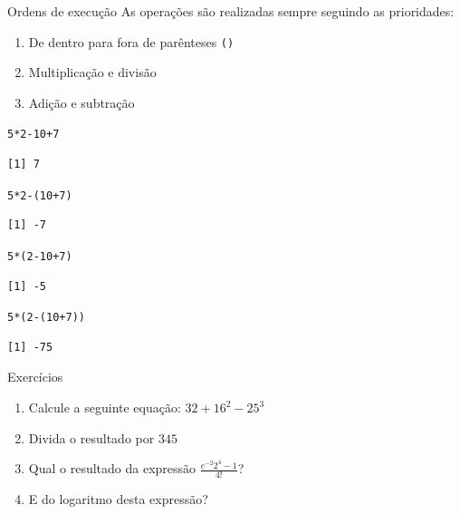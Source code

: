 \documentclass[10pt,handout]{beamer}\usepackage[]{graphicx}\usepackage[]{color}
\makeatletter
\newcommand{\hlnum}[1]{\textcolor[rgb]{0.686,0.059,0.569}{#1}}%
\newcommand{\hlopt}[1]{\textcolor[rgb]{0,0,0}{#1}}%
\newcommand{\hlstd}[1]{\textcolor[rgb]{0.345,0.345,0.345}{#1}}%
\newenvironment{kframe}{%
 \def\at@end@of@kframe{}%
 \ifinner\ifhmode%
  \def\at@end@of@kframe{\end{minipage}}%
  \begin{minipage}{\columnwidth}%
 \fi\fi%
 \def\FrameCommand##1{\hskip\@totalleftmargin \hskip-\fboxsep
 \colorbox{shadecolor}{##1}\hskip-\fboxsep
     \hskip-\linewidth \hskip-\@totalleftmargin \hskip\columnwidth}%
 \MakeFramed {\advance\hsize-\width
   \@totalleftmargin\z@ \linewidth\hsize
   \@setminipage}}%
 {\par\unskip\endMakeFramed%
 \at@end@of@kframe}
\newenvironment{knitrout}{}{} %
\makeatother
\begin{document}
\begin{frame}[fragile]{Ordens de execução}
As operações são realizadas sempre seguindo as prioridades:
\begin{enumerate}
\item De dentro para fora de parênteses \verb|()|
\item Multiplicação e divisão
\item Adição e subtração
\end{enumerate}
\begin{knitrout}\small
{}\color{fgcolor}\begin{kframe}
\begin{alltt}
\hlnum{5} \hlopt{*} \hlnum{2} \hlopt{-} \hlnum{10} \hlopt{+} \hlnum{7}
\end{alltt}
\begin{verbatim}
[1] 7
\end{verbatim}
\begin{alltt}
\hlnum{5} \hlopt{*} \hlnum{2} \hlopt{-} \hlstd{(}\hlnum{10} \hlopt{+} \hlnum{7}\hlstd{)}
\end{alltt}
\begin{verbatim}
[1] -7
\end{verbatim}
\begin{alltt}
\hlnum{5} \hlopt{*} \hlstd{(}\hlnum{2} \hlopt{-} \hlnum{10} \hlopt{+} \hlnum{7}\hlstd{)}
\end{alltt}
\begin{verbatim}
[1] -5
\end{verbatim}
\begin{alltt}
\hlnum{5} \hlopt{*} \hlstd{(}\hlnum{2} \hlopt{-} \hlstd{(}\hlnum{10} \hlopt{+} \hlnum{7}\hlstd{))}
\end{alltt}
\begin{verbatim}
[1] -75
\end{verbatim}
\end{kframe}
\end{knitrout}
\end{frame}

\begin{frame}[fragile]{Exercícios}
  \begin{enumerate}
  \item Calcule a seguinte equação: $32 + 16^2 - 25^3$
  \item Divida o resultado por $345$
  \item Qual o resultado da expressão $\frac{e^{-2}  2^{4} - 1}{4!}$?
  \item E do logaritmo desta expressão?
  \end{enumerate}
\end{frame}
\end{document}

